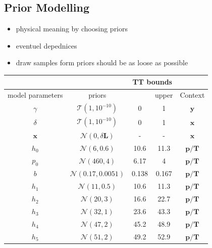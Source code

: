 \subsection{Prior Modelling}
\begin{itemize}
	\item physical meaning by choosing priors
	\item eventuel depednices
	\item draw samples form priors should be as loose as possible
\end{itemize}
\begin{table}
	\centering
	\begin{tabular}{ |c||c|c|c|c|   }
		\hline
		& &\multicolumn{2}{|c|}{TT bounds}&\\
		\hline
		model parameters& priors&\makecell{lower}& \makecell{upper\\
		}&Context\\
		\hline
		$\gamma$ & $\mathcal{T}(1,10^{-10})$ &0 &1& $\bm{y}$\\ \hhline{|=||=|=|=|=|}
		$\delta$ &$\mathcal{T}(1,10^{-10})$ & 0&1& $\bm{x}$\\ \hline
		$\bm{x}$ &$\mathcal{N}(0,\delta \bm{L})$ & -&-& $\bm{x}$\\ \hhline{|=||=|=|=|=|}
		$h_0$ &  $\mathcal{N}(6,0.6)$& 10.6&11.3&$\bm{p/T}$\\ \hline
		$p_0$ &  $\mathcal{N}(460,4)$&6.17 &4&$\bm{p/T}$\\ \hline
		$b$ &  $\mathcal{N}(0.17,0.0051)$& 0.138  &0.167&$\bm{p/T}$\\ \hline
		$h_{1}$ &  $\mathcal{N}(11,0.5)$&10.6 &11.3&$\bm{p/T}$\\ \hline
		$h_{2}$ &  $\mathcal{N}(20,3)$&16.6 &22.7&$\bm{p/T}$\\ \hline
		$h_{3}$ &  $\mathcal{N}(32,1)$&23.6 &43.3&$\bm{p/T}$\\ \hline
		$h_{4}$ &  $\mathcal{N}(47,2)$&45.2 &48.9&$\bm{p/T}$\\ \hline
		$h_{5}$ &  $\mathcal{N}(51,2)$&49.2 &52.9&$\bm{p/T}$\\ \hline

\end{tabular}
\end{table}
